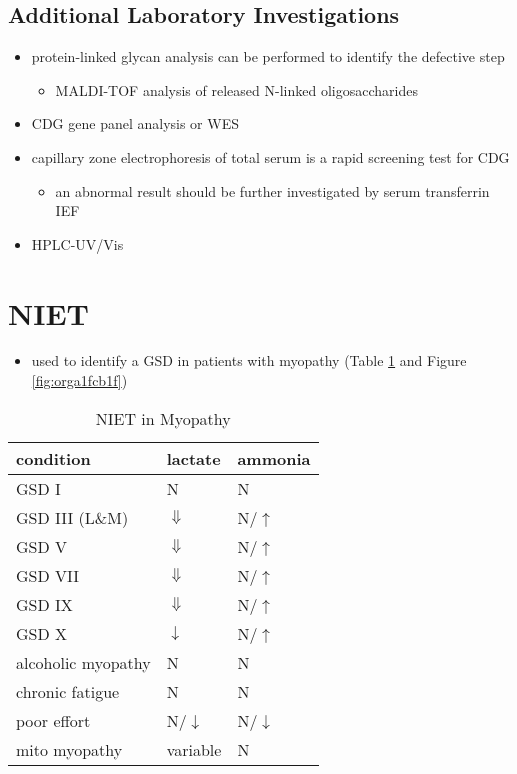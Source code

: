 \documentclass[12pt]{scrartcl}
\begin{document}
\subsection{Additional Laboratory Investigations}
\label{sec:org0945c05}
\begin{itemize}
\item protein-linked glycan analysis can be performed to identify the defective step
\begin{itemize}
\item MALDI-TOF analysis of released N-linked oligosaccharides
\end{itemize}
\item CDG gene panel analysis or WES
\item capillary zone electrophoresis of total serum is a rapid screening
test for CDG
\begin{itemize}
\item an abnormal result should be further investigated by serum
transferrin IEF
\end{itemize}
\item HPLC-UV/Vis
\end{itemize}
\section{NIET}
\label{sec:org47a3020}
\begin{itemize}
\item used to identify a GSD in patients with myopathy (Table
\ref{tab:org0559aea} and Figure \ref{fig:orga1fcb1f})
\end{itemize}

\begin{table}[htbp]
\caption{\label{tab:org0559aea}NIET in Myopathy}
\centering
\begin{tabular}{lll}
condition & lactate & ammonia\\
\hline
GSD I & N & N\\
GSD III (L\&M) & \(\Downarrow\) & N/\(\uparrow\)\\
GSD V & \(\Downarrow\) & N/\(\uparrow\)\\
GSD VII & \(\Downarrow\) & N/\(\uparrow\)\\
GSD IX & \(\Downarrow\) & N/\(\uparrow\)\\
GSD X & \(\downarrow\) & N/\(\uparrow\)\\
alcoholic myopathy & N & N\\
chronic fatigue & N & N\\
poor effort & N/\(\downarrow\) & N/\(\downarrow\)\\
mito myopathy & variable & N\\
\end{tabular}
\end{table}
\end{document}
